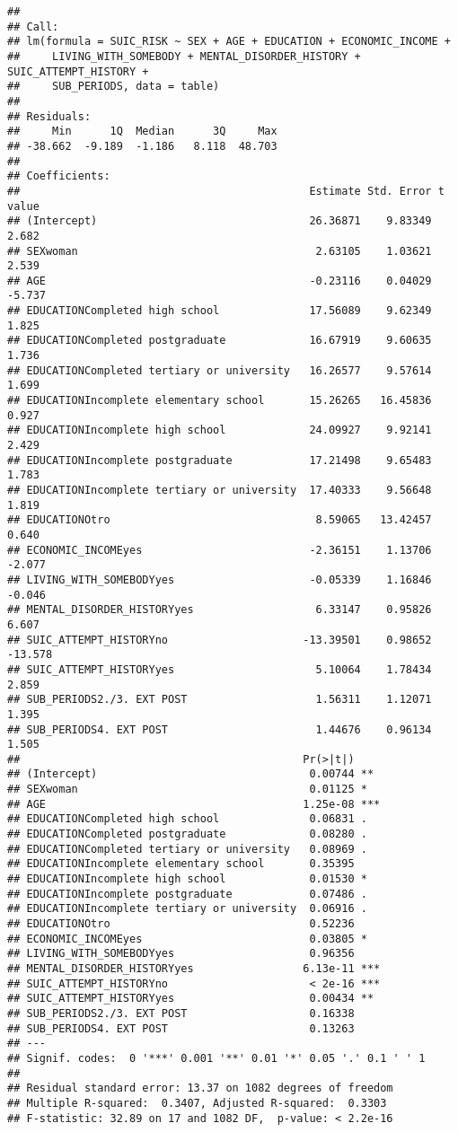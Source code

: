 \documentclass[
]{book}
\begin{document}
\begin{verbatim}
## 
## Call:
## lm(formula = SUIC_RISK ~ SEX + AGE + EDUCATION + ECONOMIC_INCOME + 
##     LIVING_WITH_SOMEBODY + MENTAL_DISORDER_HISTORY + SUIC_ATTEMPT_HISTORY + 
##     SUB_PERIODS, data = table)
## 
## Residuals:
##     Min      1Q  Median      3Q     Max 
## -38.662  -9.189  -1.186   8.118  48.703 
## 
## Coefficients:
##                                             Estimate Std. Error t value
## (Intercept)                                 26.36871    9.83349   2.682
## SEXwoman                                     2.63105    1.03621   2.539
## AGE                                         -0.23116    0.04029  -5.737
## EDUCATIONCompleted high school              17.56089    9.62349   1.825
## EDUCATIONCompleted postgraduate             16.67919    9.60635   1.736
## EDUCATIONCompleted tertiary or university   16.26577    9.57614   1.699
## EDUCATIONIncomplete elementary school       15.26265   16.45836   0.927
## EDUCATIONIncomplete high school             24.09927    9.92141   2.429
## EDUCATIONIncomplete postgraduate            17.21498    9.65483   1.783
## EDUCATIONIncomplete tertiary or university  17.40333    9.56648   1.819
## EDUCATIONOtro                                8.59065   13.42457   0.640
## ECONOMIC_INCOMEyes                          -2.36151    1.13706  -2.077
## LIVING_WITH_SOMEBODYyes                     -0.05339    1.16846  -0.046
## MENTAL_DISORDER_HISTORYyes                   6.33147    0.95826   6.607
## SUIC_ATTEMPT_HISTORYno                     -13.39501    0.98652 -13.578
## SUIC_ATTEMPT_HISTORYyes                      5.10064    1.78434   2.859
## SUB_PERIODS2./3. EXT POST                    1.56311    1.12071   1.395
## SUB_PERIODS4. EXT POST                       1.44676    0.96134   1.505
##                                            Pr(>|t|)    
## (Intercept)                                 0.00744 ** 
## SEXwoman                                    0.01125 *  
## AGE                                        1.25e-08 ***
## EDUCATIONCompleted high school              0.06831 .  
## EDUCATIONCompleted postgraduate             0.08280 .  
## EDUCATIONCompleted tertiary or university   0.08969 .  
## EDUCATIONIncomplete elementary school       0.35395    
## EDUCATIONIncomplete high school             0.01530 *  
## EDUCATIONIncomplete postgraduate            0.07486 .  
## EDUCATIONIncomplete tertiary or university  0.06916 .  
## EDUCATIONOtro                               0.52236    
## ECONOMIC_INCOMEyes                          0.03805 *  
## LIVING_WITH_SOMEBODYyes                     0.96356    
## MENTAL_DISORDER_HISTORYyes                 6.13e-11 ***
## SUIC_ATTEMPT_HISTORYno                      < 2e-16 ***
## SUIC_ATTEMPT_HISTORYyes                     0.00434 ** 
## SUB_PERIODS2./3. EXT POST                   0.16338    
## SUB_PERIODS4. EXT POST                      0.13263    
## ---
## Signif. codes:  0 '***' 0.001 '**' 0.01 '*' 0.05 '.' 0.1 ' ' 1
## 
## Residual standard error: 13.37 on 1082 degrees of freedom
## Multiple R-squared:  0.3407, Adjusted R-squared:  0.3303 
## F-statistic: 32.89 on 17 and 1082 DF,  p-value: < 2.2e-16
\end{verbatim}
\end{document}
